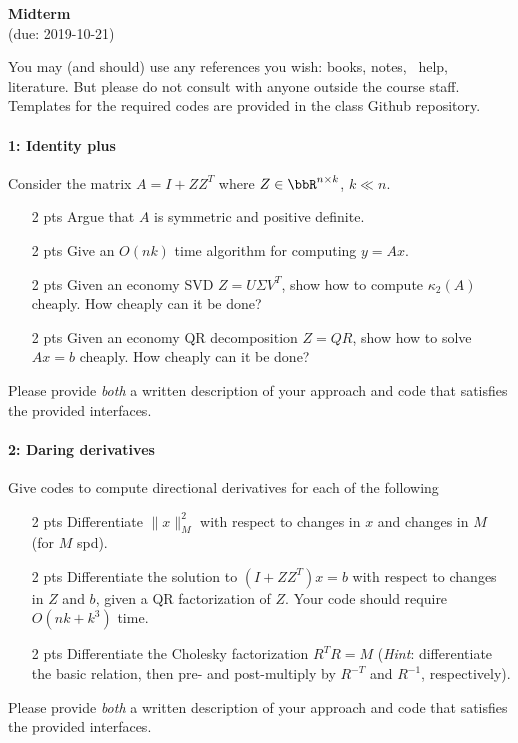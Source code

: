 \documentclass[12pt, leqno]{article} %
\begin{document}
\pagestyle{fancy}
\fancyfoot{}
\begin{center}
  {\large{\bf Midterm}} \\ (due: 2019-10-21)
\end{center}

You may (and should) use any references you wish: books, notes,
\matlab\ help, literature.  But please do not consult with anyone
outside the course staff.  Templates for the required codes are
provided in the class Github repository.

\paragraph*{1: Identity plus}
Consider the matrix $A = I + ZZ^T$ where $Z \in \bbR^{n \times k}$,
$k \ll n$.
\begin{itemize}
\item[2 pts] Argue that $A$ is symmetric and positive definite.
\item[2 pts] Give an $O(nk)$ time algorithm for computing $y = Ax$.
\item[2 pts] Given an economy SVD $Z = U \Sigma V^T$, show how to compute
  $\kappa_2(A)$ cheaply.  How cheaply can it be done?
\item[2 pts] Given an economy QR decomposition $Z = QR$, show how to solve
  $Ax = b$ cheaply.  How cheaply can it be done?
\end{itemize}
Please provide {\em both} a written description of your approach and
code that satisfies the provided interfaces.

\paragraph*{2: Daring derivatives}
Give codes to compute directional derivatives for each of the
following
\begin{itemize}
\item[2 pts] Differentiate $\|x\|_M^2$ with respect to changes in $x$ and
  changes in $M$ (for $M$ spd).
\item[2 pts] Differentiate the solution to $(I+ZZ^T) x = b$ with respect to
  changes in $Z$ and $b$, given a QR factorization of $Z$.  Your code
  should require $O(nk + k^3)$ time.
\item[2 pts] Differentiate the Cholesky factorization $R^T R = M$
  ({\em Hint}: differentiate the basic relation, then pre- and
  post-multiply by $R^{-T}$ and $R^{-1}$, respectively).
\end{itemize}
Please provide {\em both} a written description of your approach and
code that satisfies the provided interfaces.
\end{document}
